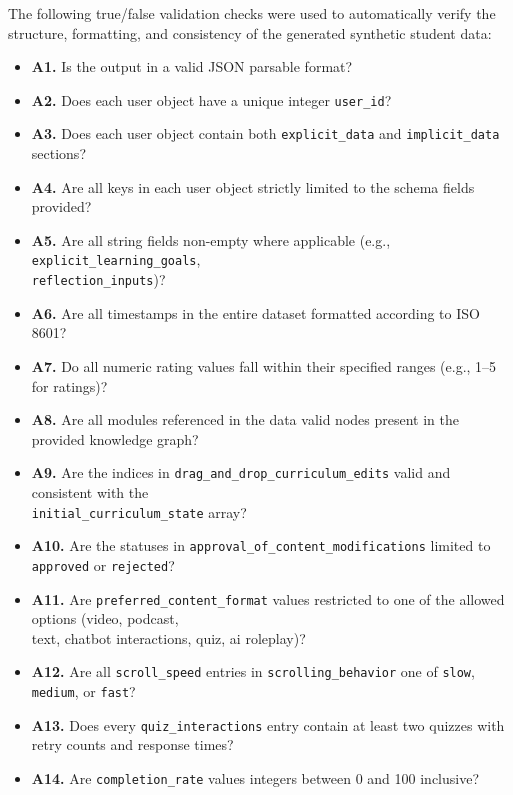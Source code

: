 The following true/false validation checks were used to automatically verify the structure, formatting, and consistency of the generated synthetic student data:

{\footnotesize
\begin{itemize}
    \item \textbf{A1.} Is the output in a valid JSON parsable format?
    \item \textbf{A2.} Does each user object have a unique integer \texttt{user\_id}?
    \item \textbf{A3.} Does each user object contain both \texttt{explicit\_data} and \texttt{implicit\_data} sections?
    \item \textbf{A4.} Are all keys in each user object strictly limited to the schema fields provided?
    \item \textbf{A5.} Are all string fields non-empty where applicable (e.g., \texttt{explicit\_learning\_goals},\\ \texttt{reflection\_inputs})?
    \item \textbf{A6.} Are all timestamps in the entire dataset formatted according to ISO 8601?
    \item \textbf{A7.} Do all numeric rating values fall within their specified ranges (e.g., 1–5 for ratings)?
    \item \textbf{A8.} Are all modules referenced in the data valid nodes present in the provided knowledge graph?
    \item \textbf{A9.} Are the indices in \texttt{drag\_and\_drop\_curriculum\_edits} valid and consistent with the \\\texttt{initial\_curriculum\_state} array?
    \item \textbf{A10.} Are the statuses in \texttt{approval\_of\_content\_modifications} limited to \texttt{approved} or \texttt{rejected}?
    \item \textbf{A11.} Are \texttt{preferred\_content\_format} values restricted to one of the allowed options (video, podcast, \\text, chatbot interactions, quiz, ai roleplay)?
    \item \textbf{A12.} Are all \texttt{scroll\_speed} entries in \texttt{scrolling\_behavior} one of \texttt{slow}, \texttt{medium}, or \texttt{fast}?
    \item \textbf{A13.} Does every \texttt{quiz\_interactions} entry contain at least two quizzes with retry counts and response times?
    \item \textbf{A14.} Are \texttt{completion\_rate} values integers between 0 and 100 inclusive?

\end{itemize}}
